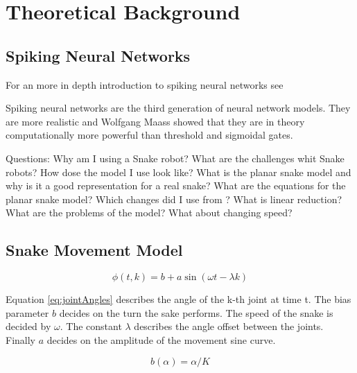 \chapter{Theoretical Background}
\label{section:theory}

\section{Spiking Neural Networks}

For an more in depth introduction to spiking neural networks see \cite{Vreeken2003}

Spiking neural networks are the third generation of neural network models. They are more realistic and Wolfgang Maass showed that they are in theory computationally more powerful than threshold and sigmoidal gates\cite{Maass1997}.



Questions:
Why am I using a Snake robot?
What are the challenges whit Snake robots?
How dose the model I use look like?
What is the planar snake model and why is it a good representation for a real snake?
What are the equations for the planar snake model?
Which changes did I use from \cite{Bing}?
What is linear reduction?
What are the problems of the model?
What about changing speed?





\section{Snake Movement Model}




\begin{equation} \label{eq:jointAngles}
\phi\left(t, k\right) = b + a \sin \left(\omega t - \lambda k\right)
\end{equation}

Equation \ref{eq:jointAngles} describes the angle of the k-th joint at time t. The bias parameter $ b $ decides on the turn the sake performs. The speed of the snake is decided by $ \omega$. The constant $\lambda $ describes the angle offset between the joints. Finally $ a $ decides on the amplitude of the movement sine curve.

\begin{equation} \label{eq:calcBias}
b\left(\alpha\right) = \alpha / K
\end{equation}

